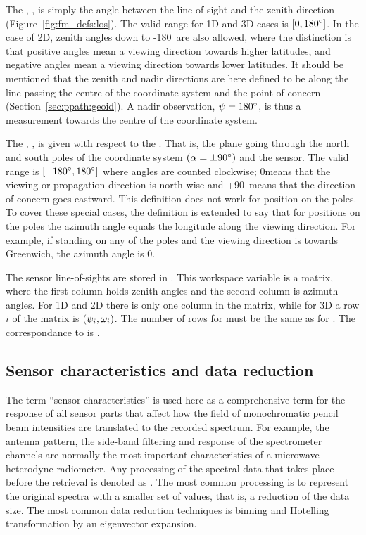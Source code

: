 The , \ZntAng, is simply the angle between the
line-of-sight and the zenith direction (Figure~\ref{fig:fm_defs:los}).
The valid range for 1D and 3D cases is $[0,180^\circ]$. In the case
of 2D, zenith angles down to -180\degree\ are also allowed, where the
distinction is that positive angles mean a viewing direction towards
higher latitudes, and negative angles mean a viewing direction towards
lower latitudes. It should be mentioned that the zenith and nadir
directions are here defined to be along the line passing the centre of
the coordinate system and the point of concern
(Section~\ref{sec:ppath:geoid}). A nadir observation,
$\psi=180^\circ$, is thus a measurement towards the centre of the
coordinate system.

The , \AzmAng, is given with respect to the
.  That is, the plane going through the
north and south poles of the coordinate system $(\alpha=\pm90^\circ)$
and the sensor. The valid range is $[-180^\circ,180^\circ]$ where
angles are counted clockwise; 0\degree means that the viewing or
propagation direction is north-wise and +90\degree\ means that the
direction of concern goes eastward. This definition does not work for
position on the poles. To cover these special cases, the definition is
extended to say that for positions on the poles the azimuth angle
equals the longitude along the viewing direction. For example, if
standing on any of the poles and the viewing direction is towards
Greenwich, the azimuth angle is 0\degree.

The sensor line-of-sights are stored in . This workspace
variable is a matrix, where the first column holds zenith angles and the second
column is azimuth angles. For 1D and 2D there is only one column in the matrix,
while for 3D a row $i$ of the matrix is $(\psi_{i},\omega_{i})$. The number
of rows for  must be the same as for
. The correspondance to  is
.


\subsection{Sensor characteristics and data reduction}
\label{sec:fm_defs:sensorchar}

The term ``sensor characteristics'' is
used here as a comprehensive term for the response of all sensor parts
that affect how the field of monochromatic pencil beam intensities are
translated to the recorded spectrum. For example, the antenna pattern,
the side-band filtering and response of the spectrometer channels are
normally the most important characteristics of a microwave heterodyne
radiometer. Any processing of the spectral data that takes place
before the retrieval is denoted as . The
most common processing is to represent the original spectra with a
smaller set of values, that is, a reduction of the data size. The most
common data reduction techniques is binning and Hotelling
transformation by an eigenvector expansion.

